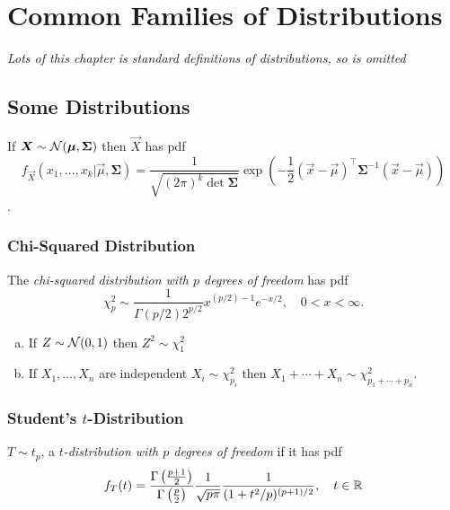 \section{Common Families of Distributions}


\begin{center}
    \emph{Lots of this chapter is standard definitions of distributions, so is omitted}
\end{center}


\subsection{Some Distributions}

\begin{definition}
    If $\bm{X} \sim \mathcal{N}(\bm{\mu}, \bm{\Sigma})$ then $\vec{X}$ has pdf
    \[
    f_{\vec{X}}(x_1, \dots, x_k \vert{} \vec{\mu}, \bm{\Sigma})  = \frac{1}{\sqrt{(2\pi)^k \det\bm{\Sigma}}} \exp\left(-\frac12 (\vec{ x}-\vec{\mu})^\top \bm{\Sigma}^{-1}(\vec{x}-\vec{\mu})\right)
    \].
\end{definition}

\subsubsection{Chi-Squared Distribution}
\begin{definition}
    The \emph{chi-squared distribution with $p$ degrees of freedom} has pdf
    \[
        \chi_p^2 \sim \frac{1}{\Gamma(p/2)2^{p/2}} x^{(p/2)-1} e^{-x/2}, \quad 0< x< \infty.
    \]
\end{definition}

\begin{theorem}
    \mbox{}
    \begin{enumerate}[a.]
        \item If $Z \sim \mathcal{N}(0, 1)$ then $Z^2 \sim \chi_1^2$
        \item If $X_1, \dots, X_n$ are independent $X_i \sim \chi_{p_i}^2$ then $X_1 + \cdots + X_n \sim \chi_{p_1 + \cdots + p_n}^2$.
    \end{enumerate}
\end{theorem}

\subsubsection{Student's $t$-Distribution}
\begin{definition}
    $T \sim t_p$, a \emph{$t$-distribution with $p$ degrees of freedom} if it has pdf
    \[
        f_T(t) = \frac{\Gamma\left(\frac{p+1}{2}\right)}{\Gamma\left(\frac{p}{2}\right)} \frac{1}{\sqrt{p\pi}} \frac{1}{(1 + t^2/p)^{(p+1)/2}}, \quad t \in \mathbb{R}{}
    \]
\end{definition}

